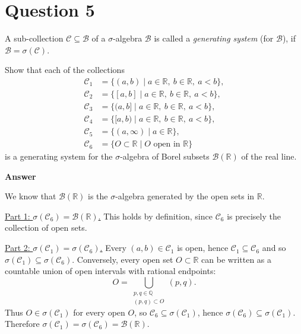 \documentclass[letterpaper]{article}
\begin{document}
		
		\clearpage
		
		\section{Question 5}
		
		A sub-collection $\mathcal{C} \subseteq \mathcal{B}$ of a $\sigma$-algebra
		$\mathcal{B}$ is called a \emph{generating system} (for $\mathcal{B}$), if
		$\mathcal{B} = \sigma(\mathcal{C})$.
		
		Show that each of the collections
		\[
		\begin{aligned}
			\mathcal{C}_1 &= \{ (a,b) \mid a \in \mathbb{R},\ b \in \mathbb{R},\ a<b \}, \\
			\mathcal{C}_2 &= \{ [a,b] \mid a \in \mathbb{R},\ b \in \mathbb{R},\ a<b \}, \\
			\mathcal{C}_3 &= \{ (a,b] \mid a \in \mathbb{R},\ b \in \mathbb{R},\ a<b \}, \\
			\mathcal{C}_4 &= \{ [a,b) \mid a \in \mathbb{R},\ b \in \mathbb{R},\ a<b \}, \\
			\mathcal{C}_5 &= \{ (a,\infty) \mid a \in \mathbb{R} \}, \\
			\mathcal{C}_6 &= \{ O \subset \mathbb{R} \mid O \text{ open in } \mathbb{R} \}
		\end{aligned}
		\]
		is a generating system for the $\sigma$-algebra of Borel subsets
		$\mathcal{B}(\mathbb{R})$ of the real line.
		
		\textbf{Answer}
		
			We know that $\mathcal{B}(\mathbb{R})$ is the $\sigma$-algebra generated by the open sets
			in $\mathbb{R}$.
			
			\medskip
			\noindent\underline{Part 1: $\sigma(\mathcal{C}_6)=\mathcal{B}(\mathbb{R})$.}
			This holds by definition, since $\mathcal{C}_6$ is precisely the collection of open sets.
			
			\medskip
			\noindent\underline{Part 2: $\sigma(\mathcal{C}_1)=\sigma(\mathcal{C}_6)$.}
			Every $(a,b)\in\mathcal{C}_1$ is open, hence $\mathcal{C}_1\subseteq\mathcal{C}_6$ and so
			$\sigma(\mathcal{C}_1)\subseteq\sigma(\mathcal{C}_6)$.
			Conversely, every open set $O\subset\mathbb{R}$ can be written as a countable union of
			open intervals with rational endpoints:
			\[
			O=\bigcup_{\substack{p,q\in\mathbb{Q}\\ (p,q)\subset O}} (p,q).
			\]
			Thus $O\in\sigma(\mathcal{C}_1)$ for every open $O$, so $\mathcal{C}_6\subseteq\sigma(\mathcal{C}_1)$,
			hence $\sigma(\mathcal{C}_6)\subseteq\sigma(\mathcal{C}_1)$.
			Therefore $\sigma(\mathcal{C}_1)=\sigma(\mathcal{C}_6)=\mathcal{B}(\mathbb{R})$.
			
\end{document}
